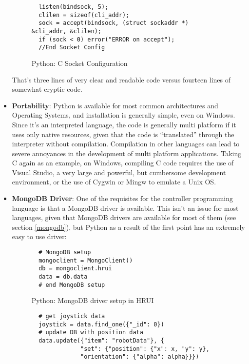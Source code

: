 \begin{itemize}
\begin{figure}[H]
\begin{verbatim}
  listen(bindsock, 5);
  clilen = sizeof(cli_addr);
  sock = accept(bindsock, (struct sockaddr *) &cli_addr, &clilen);
  if (sock < 0) error("ERROR on accept");
  //End Socket Config
  \end{verbatim}
  \caption{Python: C Socket Configuration}
  \end{figure}
  That's three lines of very clear and readable code versus fourteen lines of somewhat cryptic code.
  \item \textbf{Portability}: Python is available for most common architectures and Operating Systems, and installation is generally 
  simple, even on Windows. Since it's an interpreted language, the code is generally multi platform if it uses only native resources, 
  given that the code is ``translated'' through the interpreter without compilation. Compilation in other languages can lead to severe 
  annoyances in the development of multi platform applications. Taking C again as an example, on Windows, compiling C code requires the 
  use of Visual Studio, a very large and powerful, but cumbersome development environment, or the use of Cygwin or Mingw to emulate a 
  Unix OS.
  \item \textbf{MongoDB Driver}: One of the requisites for the controller programming language is that a MongoDB driver is available. 
  This isn't an issue for most languages, given that MongoDB drivers are available for most of them (see section \ref{mongodb}), but 
  Python as a result of the first point has an extremely easy to use driver:
  \begin{figure}[H]  
  \centering
  \captionsetup{justification=centering}
  \begin{verbatim}
  # MongoDB setup
  mongoclient = MongoClient()
  db = mongoclient.hrui
  data = db.data
  # end MongoDB setup
  \end{verbatim}
  \caption{Python: MongoDB driver setup in HRUI}
  \end{figure}
  \begin{figure}[H]  
  \centering
  \captionsetup{justification=centering}
  \begin{verbatim}
  # get joystick data
  joystick = data.find_one({"_id": 0})
  # update DB with position data
  data.update({"item": "robotData"}, {
              "set": {"position": {"x": x, "y": y},
              "orientation": {"alpha": alpha}}})
  \end{verbatim}

\end{figure}
\end{itemize}
